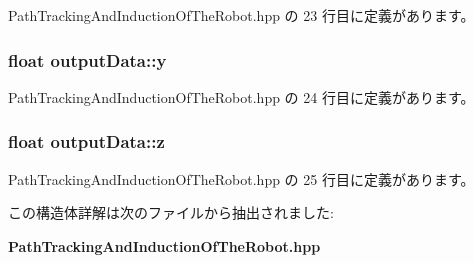  Path\-Tracking\-And\-Induction\-Of\-The\-Robot.\-hpp の 23 行目に定義があります。

\subsubsection[{y}]{\setlength{\rightskip}{0pt plus 5cm}float output\-Data\-::y}\label{structoutput_data_a9b56dfa893983cda30d0e082f1a60757}


 Path\-Tracking\-And\-Induction\-Of\-The\-Robot.\-hpp の 24 行目に定義があります。

\subsubsection[{z}]{\setlength{\rightskip}{0pt plus 5cm}float output\-Data\-::z}\label{structoutput_data_abca4e28577dd94f230bcff94199905e8}


 Path\-Tracking\-And\-Induction\-Of\-The\-Robot.\-hpp の 25 行目に定義があります。



この構造体詳解は次のファイルから抽出されました\-:\begin{DoxyCompactItemize}
\item 
{\bf Path\-Tracking\-And\-Induction\-Of\-The\-Robot.\-hpp}\end{DoxyCompactItemize}
